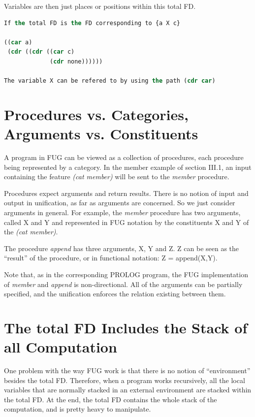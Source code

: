 \documentclass[10pt,a4paper]{report}
\begin{document}
\begin{appendices}
Variables are then just places or positions within this total FD.

\begin{lstlisting}[language=Lisp]
If the total FD is the FD corresponding to {a X c}

((car a)
 (cdr ((cdr ((car c)
             (cdr none))))))

The variable X can be refered to by using the path (cdr car)

\end{lstlisting}



\section{Procedures vs. Categories, Arguments vs. Constituents}

A program in FUG can be viewed as a collection of procedures,
each procedure being represented by a category. In the member
example of section III.1, an input containing the feature {\em (cat
member)} will be sent to the {\em member} procedure. 

Procedures expect arguments and return results. There is no
notion of input and output in unification, as far as arguments
are concerned. So we just consider arguments in general. For
example, the {\em member} procedure has two arguments, called X and
Y and represented in FUG notation by the constituents X and Y of
the {\em (cat member)}.

The procedure {\em append} has three arguments, X, Y and Z. Z can
be seen as the ``result'' of the procedure, or in functional
notation: Z = append(X,Y). 

Note that, as in the corresponding PROLOG program, the FUG
implementation of {\em member} and {\em append} is non-directional.
All of the arguments can be partially specified, and the
unification enforces the relation existing between them.



\section{The total FD Includes the Stack of all Computation}

One problem with the way FUG work is that there is no notion of
``environment'' besides the total FD. Therefore, when a program
works recursively, all the local variables that are normally
stacked in an external environment are stacked within the total
FD. At the end, the total FD contains the whole stack of the
computation, and is pretty heavy to manipulate.


\end{appendices}
\end{document}
